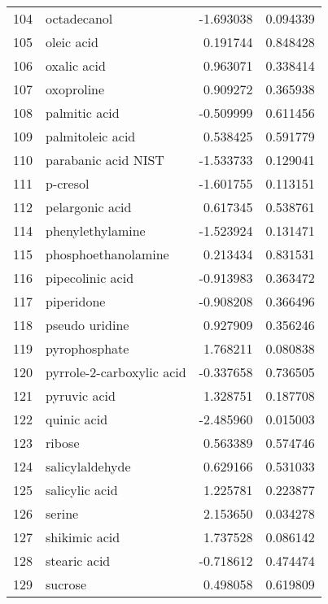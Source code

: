\begin{tabular}{llrr}
104 &                        octadecanol & -1.693038 &  0.094339 \\
105 &                         oleic acid &  0.191744 &  0.848428 \\
106 &                        oxalic acid &  0.963071 &  0.338414 \\
107 &                         oxoproline &  0.909272 &  0.365938 \\
108 &                      palmitic acid & -0.509999 &  0.611456 \\
109 &                   palmitoleic acid &  0.538425 &  0.591779 \\
110 &                parabanic acid NIST & -1.533733 &  0.129041 \\
111 &                           p-cresol & -1.601755 &  0.113151 \\
112 &                    pelargonic acid &  0.617345 &  0.538761 \\
114 &                   phenylethylamine & -1.523924 &  0.131471 \\
115 &                phosphoethanolamine &  0.213434 &  0.831531 \\
116 &                   pipecolinic acid & -0.913983 &  0.363472 \\
117 &                         piperidone & -0.908208 &  0.366496 \\
118 &                     pseudo uridine &  0.927909 &  0.356246 \\
119 &                      pyrophosphate &  1.768211 &  0.080838 \\
120 &          pyrrole-2-carboxylic acid & -0.337658 &  0.736505 \\
121 &                       pyruvic acid &  1.328751 &  0.187708 \\
122 &                        quinic acid & -2.485960 &  0.015003 \\
123 &                             ribose &  0.563389 &  0.574746 \\
124 &                    salicylaldehyde &  0.629166 &  0.531033 \\
125 &                     salicylic acid &  1.225781 &  0.223877 \\
126 &                             serine &  2.153650 &  0.034278 \\
127 &                      shikimic acid &  1.737528 &  0.086142 \\
128 &                       stearic acid & -0.718612 &  0.474474 \\
129 &                            sucrose &  0.498058 &  0.619809 \\

\end{tabular}
